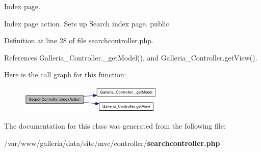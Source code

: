 Index page.

Index page action. Sets up Search index page.  public 

Definition at line 28 of file searchcontroller.php.

References Galleria\_\-Controller.\_\-getModel(), and Galleria\_\-Controller.getView().

Here is the call graph for this function:\nopagebreak
\begin{figure}[H]
\begin{center}
\leavevmode
\includegraphics[width=195pt]{classSearchController_23220fa63c8d9c3ccad8c50cd6a7195e_cgraph}
\end{center}
\end{figure}


The documentation for this class was generated from the following file:\begin{CompactItemize}
\item 
/var/www/galleria/data/site/mvc/controller/{\bf searchcontroller.php}\end{CompactItemize}
